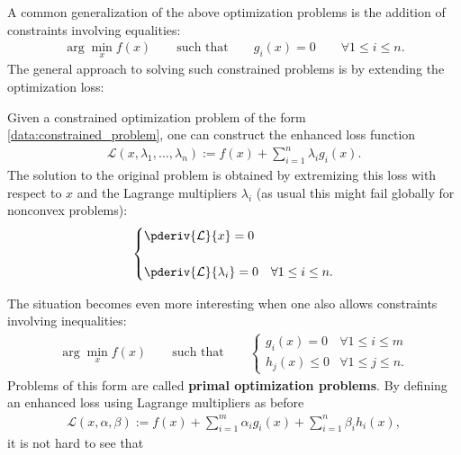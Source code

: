     A common generalization of the above optimization problems is the addition of constraints involving equalities:
    \begin{gather}
        \label{data:constrained_problem}
        \arg\min_x f(x) \qquad\text{such that}\qquad g_i(x)=0\qquad\forall 1\leq i\leq n.
    \end{gather}
    The general approach to solving such constrained problems is by extending the optimization loss:
    \begin{method}
        Given a constrained optimization problem of the form \eqref{data:constrained_problem}, one can construct the enhanced loss function
        \begin{gather}
            \mathcal{L}(x,\lambda_1,\ldots,\lambda_n) := f(x) + \sum_{i=1}^n\lambda_ig_i(x).
        \end{gather}
        The solution to the original problem is obtained by extremizing this loss with respect to $x$ and the Lagrange multipliers $\lambda_i$ (as usual this might fail globally for nonconvex problems):
        \begin{gather}
            \begin{cases}
                \pderiv{\mathcal{L}}{x} = 0\\\\
                \pderiv{\mathcal{L}}{\lambda_i} = 0&\forall1\leq i\leq n.
            \end{cases}
        \end{gather}
    \end{method}
    The situation becomes even more interesting when one also allows constraints involving inequalities:
    \begin{gather}
        \label{data:constrained_optimization}
        \arg\min_xf(x)\qquad\text{such that}\qquad
        \begin{cases}
            g_i(x)=0&\forall 1\leq i\leq m\\
            h_j(x)\leq0&\forall 1\leq j\leq n.
        \end{cases}
    \end{gather}
    Problems of this form are called \textbf{primal optimization problems}. By defining an enhanced loss using Lagrange multipliers as before
    \begin{gather}
        \mathcal{L}(x,\alpha,\beta) := f(x) + \sum_{i=1}^m\alpha_ig_i(x) + \sum_{i=1}^n\beta_ih_i(x),
    \end{gather}
    it is not hard to see that
